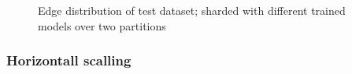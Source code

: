\begin{figure}[h!]
	\centering
	
	\caption{Edge distribution of test dataset; sharded with different trained models over two partitions}
	\label{plot:edge-distribution}
\end{figure}


\subsubsection{Horizontall scalling}
\label{subsubsec:eval-horizontall-scalling}

